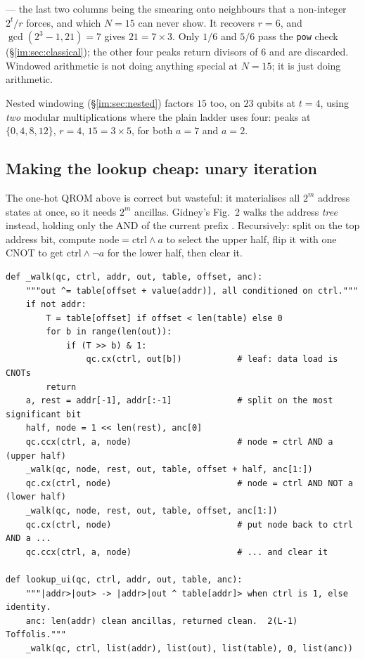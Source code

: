 \documentclass[11pt]{article}
\newcommand{\code}[1]{\texttt{#1}}
\theoremstyle{plain}
\theoremstyle{remark}
\begin{document}
\noindent
--- the last two columns being the smearing onto neighbours that a non-integer $2^t/r$ forces, and
which $N=15$ can never show. It recovers $r=6$, and $\gcd(2^3{-}1,21)=7$ gives $21=7\times3$. Only
$1/6$ and $5/6$ pass the \code{pow} check (\S\ref{im:sec:classical}); the other four peaks return
divisors of $6$ and are discarded. Windowed arithmetic is not doing anything special at $N=15$; it
is just doing arithmetic.

Nested windowing (\S\ref{im:sec:nested}) factors $15$ too, on $23$ qubits at $t=4$, using
\emph{two} modular multiplications where the plain ladder uses four: peaks at $\{0,4,8,12\}$,
$r=4$, $15=3\times5$, for both $a=7$ and $a=2$.

\subsection{Making the lookup cheap: unary iteration}\label{im:sec:ui}

The one-hot QROM above is correct but wasteful: it materialises all $2^m$ address states at once,
so it needs $2^m$ ancillas. Gidney's Fig.~2 walks the address \emph{tree} instead, holding only
the AND of the current prefix \cite{babbush}. Recursively: split on the top address bit, compute
$\text{node}=\text{ctrl}\wedge a$ to select the upper half, flip it with one CNOT to get
$\text{ctrl}\wedge\neg a$ for the lower half, then clear it.

\begin{lstlisting}
def _walk(qc, ctrl, addr, out, table, offset, anc):
    """out ^= table[offset + value(addr)], all conditioned on ctrl."""
    if not addr:
        T = table[offset] if offset < len(table) else 0
        for b in range(len(out)):
            if (T >> b) & 1:
                qc.cx(ctrl, out[b])           # leaf: data load is CNOTs
        return
    a, rest = addr[-1], addr[:-1]             # split on the most significant bit
    half, node = 1 << len(rest), anc[0]
    qc.ccx(ctrl, a, node)                     # node = ctrl AND a      (upper half)
    _walk(qc, node, rest, out, table, offset + half, anc[1:])
    qc.cx(ctrl, node)                         # node = ctrl AND NOT a  (lower half)
    _walk(qc, node, rest, out, table, offset, anc[1:])
    qc.cx(ctrl, node)                         # put node back to ctrl AND a ...
    qc.ccx(ctrl, a, node)                     # ... and clear it

def lookup_ui(qc, ctrl, addr, out, table, anc):
    """|addr>|out> -> |addr>|out ^ table[addr]> when ctrl is 1, else identity.
    anc: len(addr) clean ancillas, returned clean.  2(L-1) Toffolis."""
    _walk(qc, ctrl, list(addr), list(out), list(table), 0, list(anc))
\end{lstlisting}
\end{document}
